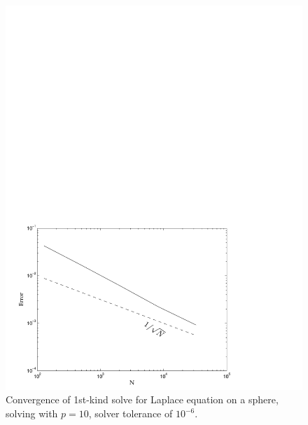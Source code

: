 \begin{figure}[h]
\begin{center}
	\includegraphics[width=14cm]{img/FirstKindConvergence.pdf}
	\caption{Convergence of 1st-kind solve for Laplace equation on a sphere, solving with $p=10$, solver tolerance of $10^{-6}$.}
	\label{fig:laplace_1st_convergence}
\end{center}
\end{figure}

